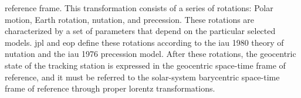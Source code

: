 \documentclass{article}
\begin{document}
                    reference frame. This transformation consists
                    of a series of rotations: Polar motion, Earth
                    rotation, \gls{nutation}, and \gls{precession}.
                    These rotations are characterized by a set of
                    parameters that depend on the particular
                    selected models. \gls{jpl} and \gls{eop}
                    define these rotations according to the
                    \gls{iau} 1980 theory of \gls{nutation} and the
                    \gls{iau} 1976 \gls{precession} model.
                    After these rotations, the geocentric state
                    of the tracking station is expressed in the
                    geocentric space-time frame of reference,
                    and it must be referred to the solar-system
                    barycentric space-time frame of reference
                    through proper \glspl{lorentz transformation}.
\end{document}
